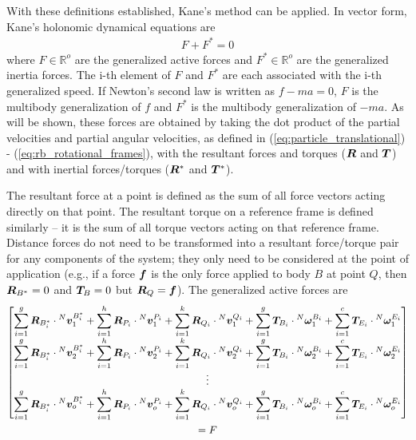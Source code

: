 With these definitions established, Kane's method can be applied. In vector
form, Kane's holonomic dynamical equations are
\begin{align}
\label{eq:kanes_eq}
F + F^* = 0
\end{align}
where $F\in\mathbb{R}^o$ are the generalized active forces and
$F^*\in\mathbb{R}^o$ are the generalized inertia forces. The i-th element of
$F$ and $F^*$ are each associated with the i-th generalized speed. If Newton's
second law is written as $f - ma = 0$, $F$ is the multibody generalization of
$f$ and $F^*$ is the multibody generalization of $-ma$. As will be shown, these
forces are obtained by taking the dot product of the partial velocities and
partial angular velocities, as defined in (\ref{eq:particle_translational}) -
(\ref{eq:rb_rotational_frames}), with the resultant forces and torques
($\boldsymbol{R}$ and $\boldsymbol{T}$) and with inertial forces/torques ($\boldsymbol{R}^*$ and
$\boldsymbol{T}^*$).

The resultant force at a point is defined as the sum of all force vectors
acting directly on that point. The resultant torque on a reference frame is
defined similarly -- it is the sum of all torque vectors acting on that
reference frame. Distance forces do not need to be transformed into a resultant
force/torque pair for any components of the system; they only need to be
considered at the point of application (e.g., if a force $\boldsymbol{f}$ is the only
force applied to body $B$ at point $Q$, then $\boldsymbol{R}_{B^*}=0$ and
$\boldsymbol{T}_B=0$ but $\boldsymbol{R}_Q=\boldsymbol{f}$). The generalized active forces are
\begin{multline}
\label{eq:definition_F}
\begin{bmatrix}
\displaystyle \sum_{i=1}^g \boldsymbol{R}_{B^*_i} \cdot {^N}\boldsymbol{v}^{B^*_i}_1 +
\sum_{i=1}^h \boldsymbol{R}_{P_i} \cdot {^N}\boldsymbol{v}^{P_i}_1 +
\sum_{i=1}^k \boldsymbol{R}_{Q_i} \cdot {^N}\boldsymbol{v}^{Q_i}_1 +
\sum_{i=1}^g \boldsymbol{T}_{B_i} \cdot {^N}\boldsymbol{\omega}^{B_i}_1 +
\sum_{i=1}^c \boldsymbol{T}_{E_i} \cdot {^N}\boldsymbol{\omega}^{E_i}_1 \\
\displaystyle \sum_{i=1}^g \boldsymbol{R}_{B^*_i} \cdot {^N}\boldsymbol{v}^{B^*_i}_2 +
\sum_{i=1}^h \boldsymbol{R}_{P_i} \cdot {^N}\boldsymbol{v}^{P_i}_2 +
\sum_{i=1}^k \boldsymbol{R}_{Q_i} \cdot {^N}\boldsymbol{v}^{Q_i}_2 +
\sum_{i=1}^g \boldsymbol{T}_{B_i} \cdot {^N}\boldsymbol{\omega}^{B_i}_2 +
\sum_{i=1}^c \boldsymbol{T}_{E_i} \cdot {^N}\boldsymbol{\omega}^{E_i}_2 \\
\displaystyle \vdots \\
\displaystyle \sum_{i=1}^g \boldsymbol{R}_{B^*_i} \cdot {^N}\boldsymbol{v}^{B^*_i}_o +
\sum_{i=1}^h \boldsymbol{R}_{P_i} \cdot {^N}\boldsymbol{v}^{P_i}_o +
\sum_{i=1}^k \boldsymbol{R}_{Q_i} \cdot {^N}\boldsymbol{v}^{Q_i}_o +
\sum_{i=1}^g \boldsymbol{T}_{B_i} \cdot {^N}\boldsymbol{\omega}^{B_i}_o +
\sum_{i=1}^c \boldsymbol{T}_{E_i} \cdot {^N}\boldsymbol{\omega}^{E_i}_o
\end{bmatrix}\\
=F
\end{multline}

